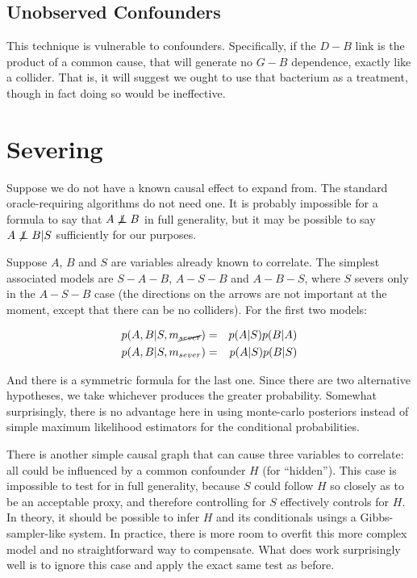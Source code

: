 \documentclass[letterpaper]{article}
\newcommand\indep{\protect\mathpalette{\protect\independenT}{\perp}}
\def\independenT#1#2{\mathrel{\rlap{$#1#2$}\mkern2mu{#1#2}}}
\begin{document}
\subsection{Unobserved Confounders}

This technique is vulnerable to confounders.  Specifically, if the
$D-B$ link is the product of a common cause, that will generate no
$G-B$ dependence, exactly like a collider.  That is, it will suggest
we ought to use that bacterium as a treatment, though in fact doing so
would be ineffective.

\section{Severing}

Suppose we do not have a known causal effect to expand from.  The
standard oracle-requiring algorithms do not need one.  It is probably
impossible for a formula to say that $A\not\indep B$ in full
generality, but it may be possible to say $A\not\indep B|S$
sufficiently for our purposes.

Suppose $A$, $B$ and $S$ are variables already known to correlate.  The simplest
associated models are $S-A-B$, $A-S-B$ and $A-B-S$, where $S$ severs only in
the $A-S-B$ case (the directions on the arrows are not important at the
moment, except that there can be no colliders).  For the first two
models:

\begin{eqnarray*}
  p(A,B|S,m_{\cancel{sever}}) & = & p(A|S)p(B|A) \\
  p(A,B|S,m_{sever}) & = & p(A|S)p(B|S)
\end{eqnarray*}

And there is a symmetric formula for the last one.  Since there are
two alternative hypotheses, we take whichever produces the greater
probability.  Somewhat surprisingly, there is no advantage here in
using monte-carlo posteriors instead of simple maximum likelihood estimators
for the conditional probabilities.

There is another simple causal graph that can cause three variables to
correlate: all could be influenced by a common confounder $H$ (for
``hidden'').  This case is impossible to test for in full generality,
because $S$ could follow $H$ so closely as to be an acceptable proxy,
and therefore controlling for $S$ effectively controls for $H$.  In
theory, it should be possible to infer $H$ and its conditionals usings
a Gibbs-sampler-like system.  In practice, there is more room to
overfit this more complex model and no straightforward way to
compensate.  What does work surprisingly well is to ignore this case
and apply the exact same test as before.
\end{document}
